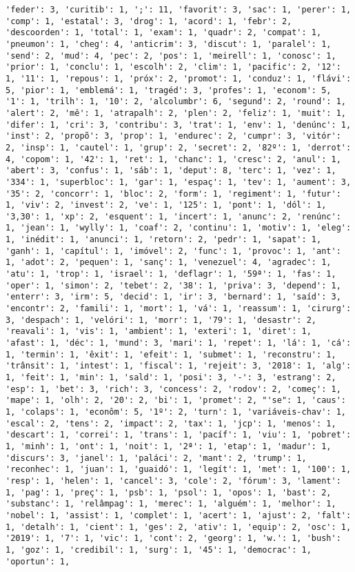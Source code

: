 \documentclass[11pt]{article}
\begin{document}
\begin{Verbatim}[commandchars=\\\{\}]
'feder': 3, 'curitib': 1, ';': 11, 'favorit': 3, 'sac': 1, 'perer': 1, 'comp': 1, 'estatal': 3, 'drog': 1, 'acord': 1, 'febr': 2, 'descoorden': 1, 'total': 1, 'exam': 1, 'quadr': 2, 'compat': 1, 'pneumon': 1, 'cheg': 4, 'anticrim': 3, 'discut': 1, 'paralel': 1, 'send': 2, 'mud': 4, 'pec': 2, 'pos': 1, 'meirell': 1, 'conosc': 1, 'prior': 1, 'conclu': 1, 'escolh': 2, 'clim': 1, 'pacific': 2, '12': 1, '11': 1, 'repous': 1, 'próx': 2, 'promot': 1, 'conduz': 1, 'flávi': 5, 'pior': 1, 'emblemá': 1, 'tragéd': 3, 'profes': 1, 'econom': 5, '1': 1, 'trilh': 1, '10': 2, 'alcolumbr': 6, 'segund': 2, 'round': 1, 'alert': 2, 'mê': 1, 'atrapalh': 2, 'plen': 2, 'feliz': 1, 'muit': 1, 'difer': 1, 'cri': 3, 'contribu': 3, 'trat': 1, 'env': 1, 'denúnc': 1, 'inst': 2, 'propõ': 3, 'prop': 1, 'endurec': 2, 'cumpr': 3, 'vitór': 2, 'insp': 1, 'cautel': 1, 'grup': 2, 'secret': 2, '82º': 1, 'derrot': 4, 'copom': 1, '42': 1, 'ret': 1, 'chanc': 1, 'cresc': 2, 'anul': 1, 'abert': 3, 'confus': 1, 'sáb': 1, 'deput': 8, 'terc': 1, 'vez': 1, '334': 1, 'superbloc': 1, 'gar': 1, 'espaç': 1, 'tev': 1, 'aument': 3, '35': 2, 'concorr': 1, 'bloc': 2, 'form': 1, 'regiment': 1, 'futur': 1, 'viv': 2, 'invest': 2, 've': 1, '125': 1, 'pont': 1, 'dól': 1, '3,30': 1, 'xp': 2, 'esquent': 1, 'incert': 1, 'anunc': 2, 'renúnc': 1, 'jean': 1, 'wylly': 1, 'coaf': 2, 'continu': 1, 'motiv': 1, 'eleg': 1, 'inédit': 1, 'anunci': 1, 'retorn': 2, 'pedr': 1, 'sapat': 1, 'ganh': 1, 'capítul': 1, 'imóvel': 2, 'func': 1, 'provoc': 1, 'ant': 1, 'adot': 2, 'pequen': 1, 'sanç': 1, 'venezuel': 4, 'agradec': 1, 'atu': 1, 'trop': 1, 'israel': 1, 'deflagr': 1, '59ª': 1, 'fas': 1, 'oper': 1, 'simon': 2, 'tebet': 2, '38': 1, 'priva': 3, 'depend': 1, 'enterr': 3, 'irm': 5, 'decid': 1, 'ir': 3, 'bernard': 1, 'saíd': 3, 'encontr': 2, 'famili': 1, 'mort': 1, 'vá': 1, 'reassum': 1, 'cirurg': 3, 'despach': 1, 'velóri': 1, 'morr': 1, '79': 1, 'desastr': 2, 'reavali': 1, 'vis': 1, 'ambient': 1, 'exteri': 1, 'diret': 1, 'afast': 1, 'déc': 1, 'mund': 3, 'mari': 1, 'repet': 1, 'lá': 1, 'cá': 1, 'termin': 1, 'êxit': 1, 'efeit': 1, 'submet': 1, 'reconstru': 1, 'trânsit': 1, 'intest': 1, 'fiscal': 1, 'rejeit': 3, '2018': 1, 'alg': 1, 'feit': 1, 'min': 1, 'sald': 1, 'posi': 3, '-': 3, 'estrang': 2, 'esp': 1, 'bet': 3, 'rich': 3, 'concess': 2, 'rodov': 2, 'começ': 1, 'mape': 1, 'olh': 2, '20': 2, 'bi': 1, 'promet': 2, "'se": 1, 'caus': 1, 'colaps': 1, 'econôm': 5, '1º': 2, 'turn': 1, 'variáveis-chav': 1, 'escal': 2, 'tens': 2, 'impact': 2, 'tax': 1, 'jcp': 1, 'menos': 1, 'descart': 1, 'correi': 1, 'trans': 1, 'pacíf': 1, 'viu': 1, 'pobret': 1, 'minh': 1, 'ont': 1, 'noit': 1, '2ª': 1, 'etap': 1, 'madur': 1, 'discurs': 3, 'janel': 1, 'paláci': 2, 'mant': 2, 'trump': 1, 'reconhec': 1, 'juan': 1, 'guaidó': 1, 'legít': 1, 'met': 1, '100': 1, 'resp': 1, 'helen': 1, 'cancel': 3, 'cole': 2, 'fórum': 3, 'lament': 1, 'pag': 1, 'preç': 1, 'psb': 1, 'psol': 1, 'opos': 1, 'bast': 2, 'substanc': 1, 'relâmpag': 1, 'merec': 1, 'alguém': 1, 'melhor': 1, 'nobel': 1, 'assist': 1, 'complet': 1, 'acert': 1, 'ajust': 2, 'falt': 1, 'detalh': 1, 'cient': 1, 'ges': 2, 'ativ': 1, 'equip': 2, 'osc': 1, '2019': 1, '7': 1, 'vic': 1, 'cont': 2, 'georg': 1, 'w.': 1, 'bush': 1, 'goz': 1, 'credibil': 1, 'surg': 1, '45': 1, 'democrac': 1, 'oportun': 1, 
\end{Verbatim}
\end{document}
